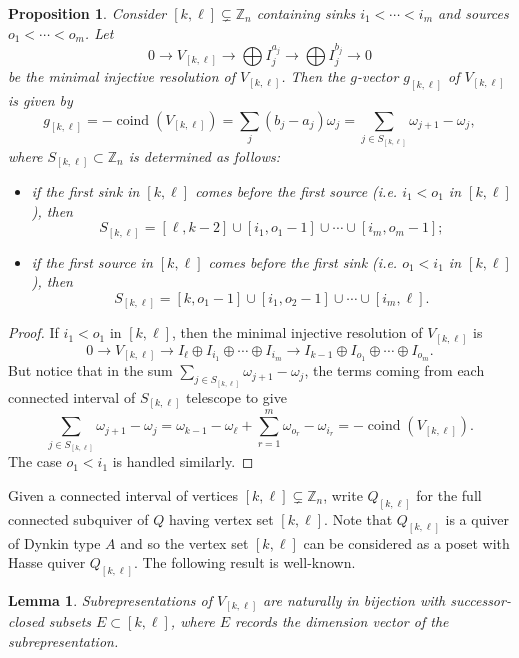 \documentclass[12pt]{amsart}
\newcommand{\ZZ}{\mathbb{Z}}
\DeclareMathOperator{\coind}{coind}
\newtheorem{lemma}[theorem]{Lemma}
\newtheorem{proposition}[theorem]{Proposition}
\theoremstyle{remark}
\numberwithin{equation}{section}
\begin{document}
\begin{proposition}\label{prop:regular coindices}
  Consider $[k,\ell]\subsetneq\ZZ_n$ containing sinks $i_1 < \cdots < i_m$ and sources $o_1 < \cdots < o_m$.
  Let 
  \[0\to V_{[k,\ell]} \to \bigoplus I_j^{a_j} \to \bigoplus I_j^{b_j}\to 0\]
  be the minimal injective resolution of $V_{[k,\ell]}$.
  Then the $g$-vector $g_{[k,\ell]}$ of $V_{[k,\ell]}$ is given by
  \[g_{[k,\ell]}=-\coind(V_{[k,\ell]})=\sum_j(b_j-a_j)\omega_j=\sum_{j\in S_{[k,\ell]}} \omega_{j+1} - \omega_j,\]
  where $S_{[k,\ell]}\subset\ZZ_n$ is determined as follows:
  \begin{itemize}
    \item if the first sink in $[k,\ell]$ comes before the first source (i.e. $i_1 < o_1$ in $[k,\ell]$), then 
    \[S_{[k,\ell]} = [\ell,k-2] \cup [i_1, o_1 -1] \cup \cdots \cup [i_m, o_m - 1];\]
    \item if the first source in $[k,\ell]$ comes before the first sink (i.e. $o_1 < i_1$ in $[k,\ell]$), then
    \[S_{[k,\ell]} = [k,o_1-1] \cup [i_1,o_2-1] \cup \cdots \cup [i_m,\ell].\]
  \end{itemize}
\end{proposition}
\begin{proof}
  If $i_1 < o_1$ in $[k,\ell]$, then the minimal injective resolution of $V_{[k,\ell]}$ is
  \[0\to V_{[k,\ell]} \to I_\ell \oplus I_{i_1} \oplus \cdots \oplus I_{i_m} \to I_{k-1} \oplus I_{o_1} \oplus \cdots \oplus I_{o_m}.\]
  But notice that in the sum $\sum\limits_{j\in S_{[k,\ell]}} \omega_{j+1} - \omega_j$, the terms coming from each connected interval of $S_{[k,\ell]}$ telescope to give
  \[\sum_{j\in S_{[k,\ell]}} \omega_{j+1} - \omega_j=\omega_{k-1}-\omega_\ell+\sum_{r=1}^m \omega_{o_r}-\omega_{i_r}=-\coind(V_{[k,\ell]}).\]
  The case $o_1<i_1$ is handled similarly.
\end{proof}

Given a connected interval of vertices $[k,\ell]\subsetneq\ZZ_n$, write $Q_{[k,\ell]}$ for the full connected subquiver of $Q$ having vertex set $[k,\ell]$.  Note that $Q_{[k,\ell]}$ is a quiver of Dynkin type $A$ and so the vertex set $[k,\ell]$ can be considered as a poset with Hasse quiver $Q_{[k,\ell]}$.  The following result is well-known.
\begin{lemma}
  Subrepresentations of $V_{[k,\ell]}$ are naturally in bijection with successor-closed subsets $E\subset[k,\ell]$, where $E$ records the dimension vector of the subrepresentation.
\end{lemma}
\end{document}
